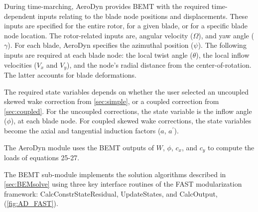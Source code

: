 \documentclass[]{aiaa-tc}%
\begin{document}
During time-marching, AeroDyn provides BEMT with the required time-dependent inputs relating to the blade node positions and displacements.  These inputs are specified for the entire rotor, for a given blade, or for a specific blade node location.  The rotor-related inputs are, angular velocity ($\Omega$), and yaw angle ($\gamma$).  For each blade, AeroDyn specifies the azimuthal position ($\psi$).   The following inputs are required at each blade node:  the local twist angle ($\theta$), the local inflow velocities ($V_x$ and $V_y$), and the node's radial distance from the center-of-rotation.  The latter accounts for blade deformations.  

The required state variables depends on whether the user selected an uncoupled skewed wake correction from \cref{sec:simple}, or a coupled correction from \cref{sec:coupled}. For the uncoupled corrections, the state variable is the inflow angle ($\phi$), at each blade node.  For coupled skewed wake corrections, the state variables become the axial and tangential induction factors ($a$, $a^\prime$).  

The AeroDyn module uses the BEMT outputs of $W$, $\phi$, $c_x$, and $c_y$ to compute the loads of equations 25-27.

The BEMT sub-module implements the solution algorithms described in \cref{sec:BEMsolve} using three key interface routines of the FAST modularization framework: CalcConstrStateResidual, UpdateStates, and CalcOutput, (\cref{fig:AD_FAST}).
\end{document}
